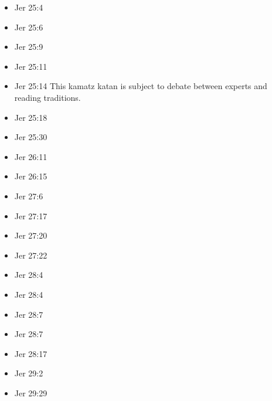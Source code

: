 \documentclass[14pt]{article}
\begin{document}
\begin{multicols}{2}
\begin{itemize}
						\item Jer 25:4
						
						\item Jer 25:6
						
						\item Jer 25:9
						
						\item Jer 25:11
						
						\item Jer 25:14 This kamatz katan is subject to debate between experts and reading traditions.
						
						\item Jer 25:18
						
						\item Jer 25:30
						
						\item Jer 26:11
						
						\item Jer 26:15
						
						\item Jer 27:6
						
						\item Jer 27:17
						
						\item Jer 27:20
						
						\item Jer 27:22
						
						\item Jer 28:4
						
						\item Jer 28:4
						
						\item Jer 28:7
						
						\item Jer 28:7
						
						\item Jer 28:17
						
						\item Jer 29:2
						
								
								\item Jer 29:29
								

\end{itemize}
\end{multicols}
\end{document}
